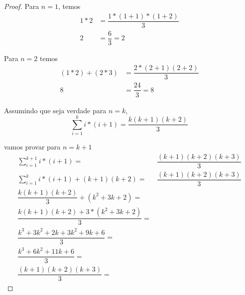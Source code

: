 \documentclass{article}
\begin{document}
\begin{proof}
	Para $n = 1$, temos
	\begin{equation}
	\begin{split}
		1 * 2 & = \dfrac{1*(1 + 1)*(1 + 2)}{3} \\
		2 & = \dfrac{6}{3} = 2
	\end{split}
	\end{equation}

	Para $n = 2$ temos
	\begin{equation}
	\begin{split}
		(1 * 2)+(2 * 3) & = \dfrac{2*(2 + 1)(2 + 2)}{3}\\
		8 & = \dfrac{24}{3} = 8
	\end{split}
	\end{equation}

	Assumindo que seja verdade para $n = k$, 
	\begin{equation}
		\sum\limits_{i = 1}^{k}i * (i+1) = \dfrac{k(k + 1)(k + 2)}{3}
	\end{equation}


	vamos provar para $n = k +1$
	\begin{equation}
		\begin{split}
		\sum\limits_{i = 1}^{k+1}i * (i+1)  = & \dfrac{(k + 1)(k + 2)(k + 3)}{3}\\
		\sum\limits_{i = 1}^{k}i * (i+1) + (k + 1)(k + 2) = &\dfrac{(k + 1)(k + 2)(k + 3)}{3}\\
		\dfrac{k(k + 1)(k + 2)}{3} + (k^2 + 3k + 2) = &\\
		\dfrac{k(k + 1)(k + 2) + 3*(k^2 + 3k + 2) }{3}  = &\\
		\dfrac{k^3 + 3k^2 + 2k + 3k^2 + 9k + 6 }{3}  = &\\
		\dfrac{k^3 + 6k^2 + 11k + 6}{3} = & \\
		\dfrac{(k + 1)(k + 2)(k + 3)}{3} = &
		\end{split}
	\end{equation}
\end{proof}
\end{document}
